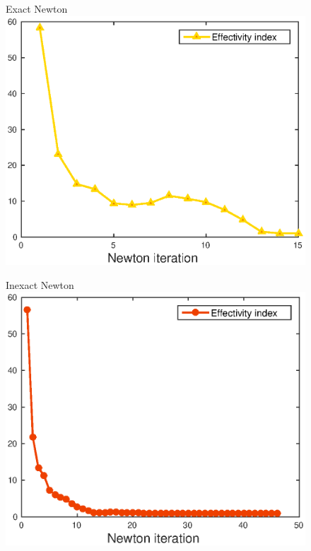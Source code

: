 \documentclass[10 pt]{beamer}
\begin{document}
\begin{frame}
\begin{figure}
\begin{minipage}[c]{.33\linewidth}
   \centering
   Exact  Newton 
\includegraphics[width=\textwidth]{fig_article/effectivity_index_exact_resolution.eps}    
\end{minipage}\hfill
\begin{minipage}[c]{.32\linewidth}
   \centering
   Inexact  Newton 
\includegraphics[width=\textwidth]{fig_article/effectivity_index_inexact_resolution.eps}     

\end{minipage}
\end{figure}
\end{frame}
\end{document}
